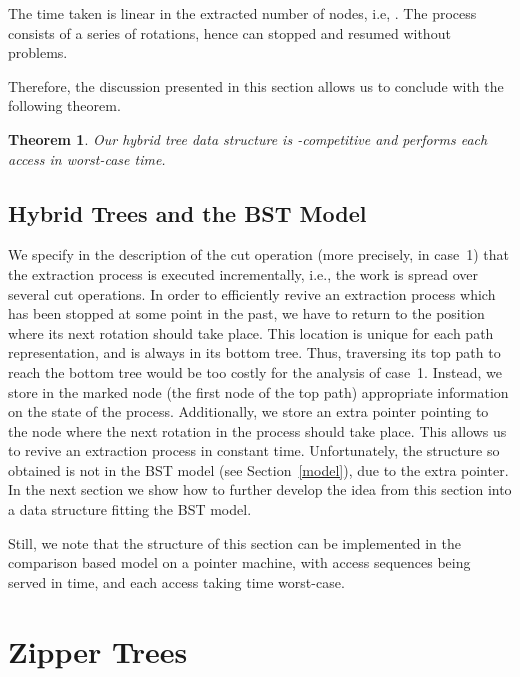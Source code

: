 \documentclass[letterpaper,11pt]{article}
\newtheorem{thm}{Theorem}
\newcommand{\toppath}{top path}
\newcommand{\bottomtree}{bottom tree}
\begin{document}
The time taken is linear in the extracted number of nodes, i.e, . The process consists of a series of rotations, hence can stopped and
resumed without problems. 

Therefore, the discussion presented in this section allows us to conclude with
the following theorem.


\begin{thm}
Our hybrid tree data structure is -competitive and performs
each access in  worst-case time.
\end{thm}





\subsection{Hybrid Trees and the BST Model} 

We specify in the description of the cut operation (more precisely, in
case~1) that the extraction process is executed incrementally, i.e., the
work is spread over several cut operations. In order to efficiently revive 
an extraction process which has been stopped at some point in the past, we
have to return to the position where its next rotation should take
place. This location is unique for each path representation, and is always
in its \bottomtree{}. Thus, traversing its \toppath{} to reach the
\bottomtree{} would be too costly for the analysis of case~1. Instead, we
store in the marked node (the first node of the \toppath{}) appropriate
information on the state of the process. Additionally, we store an extra
pointer pointing to the node where the next rotation in the process should
take place. This allows us to revive an extraction process in constant
time. Unfortunately, the structure so obtained is not in the BST model (see
Section~\ref{model}), due to the extra pointer. In the next section we show
how to further develop the idea from this section into a data structure
fitting the BST model.

Still, we note that the structure of this section can be implemented in the
comparison based model on a pointer machine, with access sequences 
being served in  time, and each access
taking  time worst-case.

\section{Zipper Trees}
\label{zippertree}
\end{document}
